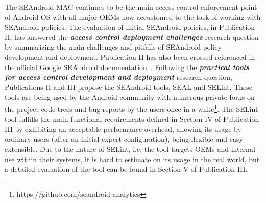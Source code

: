 The SEAndroid MAC continues to be the main access control enforcement point of Android OS with all major OEMs now accustomed to the task of working with SEAndroid policies. The evaluation of initial SEAndroid policies, in Publication II, has answered the \textit{\textbf{access control deployment challenges}} research question by summarizing the main challenges and pitfalls of SEAndroid policy development and deployment. Publication II has also been crossed-referenced in the official Google SEAndroid documentation~\cite{seanroidsize}. Following the \textbf{\textit{practical tools for access control development and deployment}} research question, Publications II and III propose the SEAndroid tools, SEAL and SELint. These tools are being used by the Android community with numerous private forks on the project code trees and bug reports by the users once in a while\footnote{https://github.com/seandroid-analytics}. The SELint tool fulfills the main functional requirements defined in Section IV of Publication III by exhibiting an acceptable performance overhead, allowing its usage by ordinary users (after an initial expert configuration), being flexible and easy extensible. Due to the nature of SELint, i.e. the tool targets OEMs and internal use within their systems, it is hard to estimate on its usage in the real world, but a detailed evaluation of the tool can be found in Section V of Publication III. 

